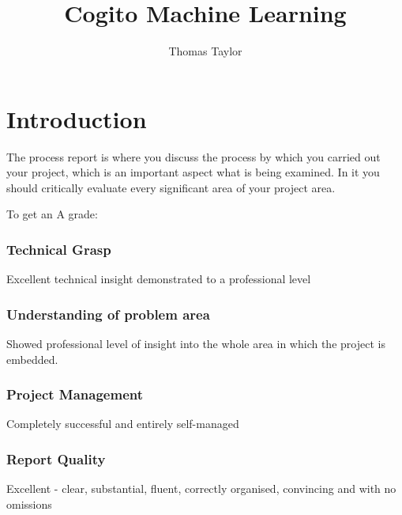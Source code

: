 \documentclass[runningheads,a4paper]{llncs}
\begin{document}
\title{Cogito Machine Learning}
\titlerunning{}
\author{Thomas Taylor\\ \mail}


%
%

\setcounter{tocdepth}{3}
\tableofcontents
\newpage

%
%


\section{Introduction}

The process report is where you discuss the process by which you carried out your project, which is an important aspect what is being examined. In it you should critically evaluate every significant area of your project area.

To get an A grade:

	\subsubsection{Technical Grasp} 
	Excellent technical insight demonstrated to a professional level
	
	\subsubsection{Understanding of problem area}
	Showed professional level of insight into the whole area in which the project is embedded. 
	
	\subsubsection{Project Management}
	Completely successful and entirely self-managed
	
	\subsubsection{Report Quality}  
	Excellent - clear, substantial, fluent, correctly organised, convincing and with no omissions
	
\end{document}
